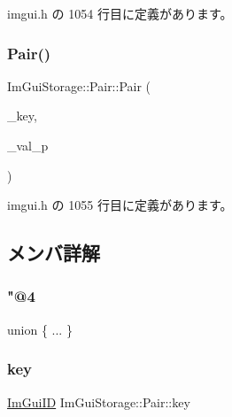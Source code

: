  imgui.\+h の 1054 行目に定義があります。

\mbox{\label{struct_im_gui_storage_1_1_pair_a4d07d60f83b4e24ee8be9ccceaab76bd}} 
\subsubsection{\texorpdfstring{Pair()}{Pair()}\hspace{0.1cm}{\footnotesize\ttfamily [3/3]}}
{\footnotesize\ttfamily Im\+Gui\+Storage\+::\+Pair\+::\+Pair (\begin{DoxyParamCaption}\item[{\mbox{\hyperlink{imgui_8h_a1785c9b6f4e16406764a85f32582236f}{Im\+Gui\+ID}}}]{\+\_\+key,  }\item[{void $\ast$}]{\+\_\+val\+\_\+p }\end{DoxyParamCaption})\hspace{0.3cm}{\ttfamily [inline]}}



 imgui.\+h の 1055 行目に定義があります。



\subsection{メンバ詳解}
\mbox{\label{struct_im_gui_storage_1_1_pair_a73bc1ed446f73086b5fb3efabfcd1e8a}} 
\subsubsection{\texorpdfstring{"@4}{@4}}
{\footnotesize\ttfamily union \{ ... \} }

\mbox{\label{struct_im_gui_storage_1_1_pair_a5b37b692d2eacc7f4f5b6f233359e6ce}} 
\subsubsection{\texorpdfstring{key}{key}}
{\footnotesize\ttfamily \mbox{\hyperlink{imgui_8h_a1785c9b6f4e16406764a85f32582236f}{Im\+Gui\+ID}} Im\+Gui\+Storage\+::\+Pair\+::key}



